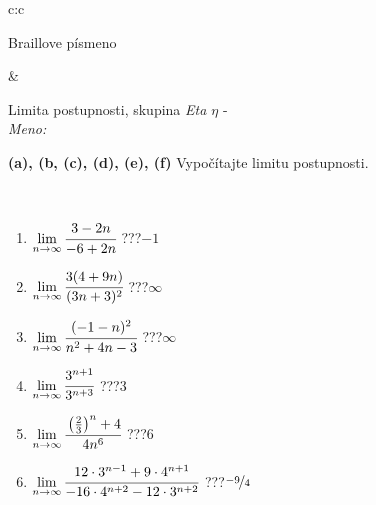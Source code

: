\documentclass[10pt]{report}
\begin{document}
\begin{tabular}{c:c}
\begin{minipage}[c][104.5mm][t]{0.5\linewidth}
\begin{center}
\begin{minipage}{0.20\linewidth}
\begin{center}
{\small Braillove písmeno}
\end{center}
\end{minipage}
\end{center}
\end{minipage}
&
\begin{minipage}[c][104.5mm][t]{0.5\linewidth}
\begin{center}
\vspace{5mm}
{\huge Limita postupnosti, skupina \textit{Eta $\eta$} -}\\[5mm]
\textit{Meno:}\phantom{xxxxxxxxxxxxxxxxxxxxxxxxxxxxxxxxxxxxxxxxxxxxxxxxxxxxxxxxxxxxxxxxx}\\[5mm]
\begin{minipage}{0.95\linewidth}
\begin{center}
{
\textbf{(a), (b, (c), (d), (e), (f)} Vypočítajte limitu postupnosti. \\[-1mm]
\phantom{x}
}
\end{center}
\end{minipage}
\\[1mm]
\begin{minipage}{0.79\linewidth}
\begin{center}
\begin{varwidth}{\linewidth}
\setlength{\itemsep}{0pt}
\begin{enumerate}
\normalsize
\item $\lim\limits_{n\to\infty}\cfrac{3-2n}{-6+2n}$\quad \dotfill\; ???\;\dotfill \quad $-1$
\item $\lim\limits_{n\to\infty}\cfrac{3(4+9n)}{(3n+3)^2}$\quad \dotfill\; ???\;\dotfill \quad $\infty$
\item $\lim\limits_{n\to\infty}\cfrac{(-1-n)^2}{n^2+4n-3}$\quad \dotfill\; ???\;\dotfill \quad $\infty$
\item $\lim\limits_{n\to\infty}\cfrac{3^{n+1}}{3^{n+3}}$\quad \dotfill\; ???\;\dotfill \quad $3$
\item $\lim\limits_{n\to\infty}\cfrac{\left(\frac{2}{3}\right)^n +4}{4n^{6}}$\quad \dotfill\; ???\;\dotfill \quad $6$
\item $\lim\limits_{n\to\infty}\cfrac{12\cdot 3^{n-1}+9\cdot 4^{n+1}}{-16\cdot 4^{n+2}-12\cdot 3^{n+2}}$\quad \dotfill\; ???\;\dotfill \quad $\nicefrac{-9}{4}$
\end{enumerate}
\end{varwidth}
\end{center}
\end{minipage}
\begin{minipage}{0.20\linewidth}

\end{minipage}
\end{center}
\end{minipage}
\end{tabular}
\end{document}
